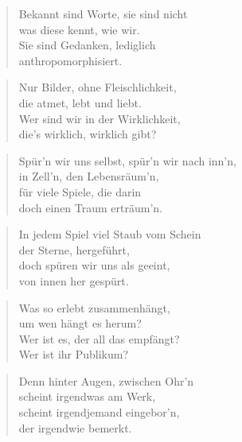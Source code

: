 \documentclass[10pt,a4paper]{article}
\begin{document}
\begin{paracol}{2}
\begin{verse}
Bekannt sind Worte, sie sind nicht \\
was diese kennt, wie wir. \\
Sie sind Gedanken, lediglich \\
anthropomorphisiert. \\
\end{verse}

\begin{verse}
Nur Bilder, ohne Fleischlichkeit, \\
die atmet, lebt und liebt. \\
Wer sind wir in der Wirklichkeit, \\
die’s wirklich, wirklich gibt? \\
\end{verse}

\begin{verse}
Spür’n wir uns selbst, spür’n wir nach inn’n, \\
in Zell’n, den Lebensräum’n, \\
für viele Spiele, die darin \\
doch einen Traum erträum’n. \\
\end{verse}

\begin{verse}
In jedem Spiel viel Staub vom Schein \\
der Sterne, hergeführt, \\
doch spüren wir uns als geeint, \\
von innen her gespürt. \\
\end{verse}

\begin{verse}
Was so erlebt zusammenhängt, \\
um wen hängt es herum? \\
Wer ist es, der all das empfängt? \\
Wer ist ihr Publikum? \\
\end{verse}

\begin{verse}
Denn hinter Augen, zwischen Ohr’n \\
scheint irgendwas am Werk, \\
scheint irgendjemand eingebor’n, \\
der irgendwie bemerkt. \\
\end{verse}


\end{paracol}
\end{document}

